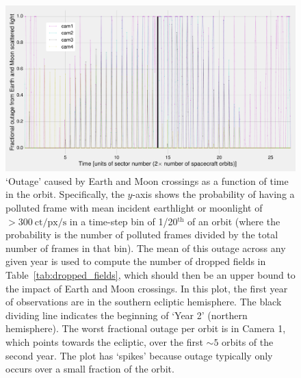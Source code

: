 \begin{figure}[!tb]
	\centering
	\includegraphics[angle=90,width=1.05\textwidth]{figures/outage_earth_moon_primary.pdf}
	\caption{`Outage' caused by Earth and Moon crossings as a function of time in the orbit.
	Specifically, the $y$-axis shows the probability of having a polluted frame with mean incident earthlight or moonlight of $>300\ \mathrm{ct/px/s}$ in a time-step bin of 1/20$^\mathrm{th}$ of an orbit (where the probability is the number of polluted frames divided by the total number of frames in that bin).
	The mean of this outage across any given year is used to compute the number of dropped fields in Table~\protect\ref{tab:dropped_fields}, which should then be an upper bound to the impact of Earth and Moon crossings.
	In this plot, the first year of observations are in the southern ecliptic hemisphere. The black dividing line indicates the beginning of `Year 2' (northern hemisphere). The worst fractional outage per orbit is in Camera 1, which points towards the ecliptic, over the first $\sim\!5$ orbits of the second year.
	The plot has `spikes' because outage typically only occurs over a small fraction of the orbit.}
	\label{fig:earth_moon_primary}
\end{figure}
